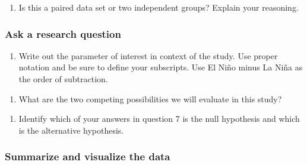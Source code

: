 \documentclass[
]{report}
\providecommand{\tightlist}{%
  \setlength{\itemsep}{0pt}\setlength{\parskip}{0pt}}
\newcommand\latexcode[1]{#1}
\begin{document}
\vspace{1in}

\begin{enumerate}
\def\labelenumi{\arabic{enumi}.}
\setcounter{enumi}{4}
\tightlist
\item
  Is this a paired data set or two independent groups? Explain your reasoning.
\end{enumerate}

\vspace{1in}

\hypertarget{ask-a-research-question-4}{%
\subsubsection*{Ask a research question}\label{ask-a-research-question-4}}

\begin{enumerate}
\def\labelenumi{\arabic{enumi}.}
\setcounter{enumi}{5}
\tightlist
\item
  Write out the parameter of interest in context of the study. Use proper notation and be sure to define your subscripts. Use El Ni\latexcode{\~{n}}o minus La Ni\latexcode{\~{n}}a as the order of subtraction.
\end{enumerate}

\vspace{1in}

\begin{enumerate}
\def\labelenumi{\arabic{enumi}.}
\setcounter{enumi}{6}
\tightlist
\item
  What are the two competing possibilities we will evaluate in this study?
\end{enumerate}

\vspace{1in}

\begin{enumerate}
\def\labelenumi{\arabic{enumi}.}
\setcounter{enumi}{7}
\tightlist
\item
  Identify which of your answers in question 7 is the null hypothesis and which is the alternative hypothesis.
\end{enumerate}

\vspace{1in}

\hypertarget{summarize-and-visualize-the-data-4}{%
\subsubsection*{Summarize and visualize the data}\label{summarize-and-visualize-the-data-4}}
\end{document}
